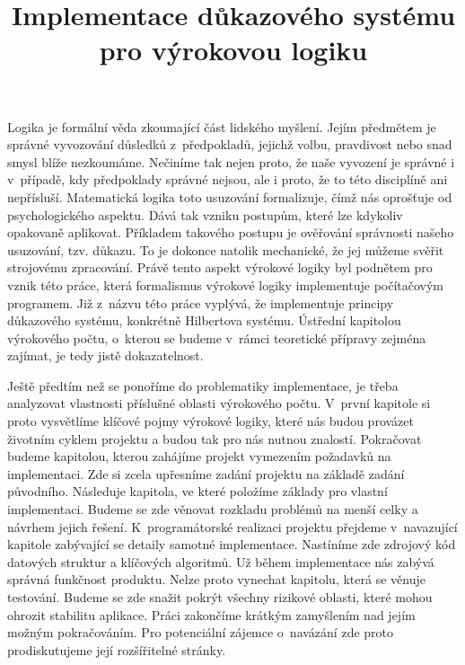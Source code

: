 \documentclass[thesis=B,czech,hidelinks]{FITthesis}[2012/06/26]
\title{Implementace důkazového systému pro výrokovou logiku}
\begin{document}
\theoremstyle{definition}
\newtheorem{ex}{Příklad}
\newtheorem{df}{Definice}
\newtheorem{lm}{Lemma}
\newtheorem{pf}{Důkaz}

%
%
%

\begin{introduction}
Logika je formální věda zkoumající část lidského myšlení. Jejím předmětem je správné vyvozování důsledků z~předpokladů, jejichž volbu, pravdivost nebo snad smysl blíže nezkoumáme. Nečiníme tak nejen proto, že naše vyvození je správné i v~případě, kdy předpoklady správné nejsou, ale i proto, že to této disciplíně ani nepřísluší. Matematická logika toto usuzování formalizuje, čímž nás oprošťuje od psychologického aspektu. Dává tak vzniku postupům, které lze kdykoliv opakovaně aplikovat. Příkladem takového postupu je ověřování správnosti našeho usuzování, tzv. důkazu. To je dokonce natolik mechanické, že jej můžeme svěřit strojovému zpracování\cite{sochor}. Právě tento aspekt výrokové logiky byl podnětem pro vznik této práce, která formalismus výrokové logiky implementuje počítačovým programem. Již z~názvu této práce vyplývá, že implementuje principy důkazového systému, konkrétně Hilbertova systému. Ústřední kapitolou výrokového počtu, o~kterou se budeme v~rámci teoretické přípravy zejména zajímat, je tedy jistě dokazatelnost.

Ještě předtím než se ponoříme do problematiky implementace, je třeba analyzovat vlastnosti příslušné oblasti výrokového počtu. V~první kapitole si proto vysvětlíme klíčové pojmy výrokové logiky, které nás budou provázet životním cyklem projektu a budou tak pro nás nutnou znalostí. Pokračovat budeme kapitolou, kterou zahájíme projekt vymezením požadavků na implementaci. Zde si zcela upřesníme zadání projektu na základě zadání původního. Následuje kapitola, ve které položíme základy pro vlastní implementaci. Budeme se zde věnovat rozkladu problémů na menší celky a návrhem jejich řešení. K~programátorské realizaci projektu přejdeme v~navazující kapitole zabývající se detaily samotné implementace. Nastíníme zde zdrojový kód datových struktur a klíčových algoritmů. Už během implementace nás zabývá správná funkčnost produktu. Nelze proto vynechat kapitolu, která se věnuje testování. Budeme se zde snažit pokrýt všechny rizikové oblasti, které mohou ohrozit stabilitu aplikace. Práci zakončíme krátkým zamyšlením nad jejím možným pokračováním. Pro potenciální zájemce o~navázání zde proto prodiskutujeme její rozšířitelné stránky.
\end{introduction}

%
%
%
\end{document}
